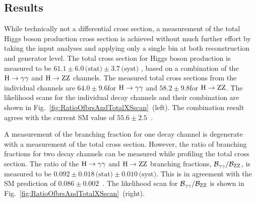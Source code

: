 \subsection{Results}
\label{sec:diffxs-results}

While technically not a differential cross section, a measurement of the total Higgs boson production cross section is achieved without much further effort by taking the input analyses and applying only a single bin at both reconstruction and generator level.
% 
The total cross section for Higgs boson production is measured to be
$61.1   \pm 6.0 \,\text{(stat)}   \pm 3.7 \,\text{(syst)}  $\pb
, based on a combination of the $\mathrm{H}\to\mathrm{\gamma}\mathrm{\gamma}$ and $\mathrm{H}\to\mathrm{Z}\mathrm{Z}$ channels.
% 
The measured total cross sections from the individual channels are $64.0\pm9.6$\pb for $\mathrm{H}\to\mathrm{\gamma}\mathrm{\gamma}$ and $58.2\pm9.8$\pb for $\mathrm{H}\to\mathrm{Z}\mathrm{Z}$.
% 
The likelihood scans for the individual decay channels and their combination are shown in Fig.~\ref{fig:RatioOfbrsAndTotalXSscan}~(left).
% 
The combination result agrees with the current SM value of $55.6\pm2.5$\pb~\cite{deFlorian:2016spz}.


A measurement of the branching fraction for one decay channel is degenerate with a measurement of the total cross section.
% 
However, the ratio of branching fractions for two decay channels can be measured while profiling the total cross section.
% 
The ratio of the $\mathrm{H}\to\mathrm{\gamma}\mathrm{\gamma}$ and $\mathrm{H}\to\mathrm{Z}\mathrm{Z}$ branching fractions, $\mathcal{B}_{\mathrm{\gamma}\mathrm{\gamma}}/\mathcal{B}_{\mathrm{Z}\mathrm{Z}}$, is measured to be
$0.092   \pm 0.018 \,\text{(stat)}   \pm 0.010 \,\text{(syst)}  $.
% 
This is in agreement with the SM prediction of $0.086 \pm 0.002$~\cite{deFlorian:2016spz}.
% 
The likelihood scan for $\mathcal{B}_{\mathrm{\gamma}\mathrm{\gamma}}/\mathcal{B}_{\mathrm{Z}\mathrm{Z}}$ is shown in Fig.~\ref{fig:RatioOfbrsAndTotalXSscan}~(right).


